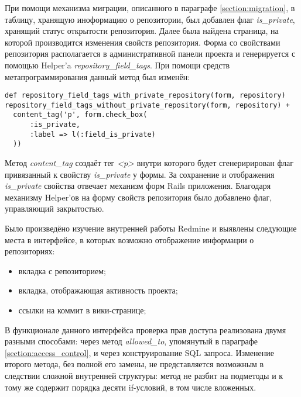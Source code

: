 При помощи механизма миграции, описанного в параграфе \ref{section:migration},
в таблицу, хранящую иноформацию о репозитории, был добавлен флаг \textit{is\_private},
хранящий статус открытости репозитория. Далее была найдена страница, на которой
производится изменения свойств репозитория. Форма со свойствами репозитория
располагается в административной панели проекта и генерируется с помощью
Helper'a \textit{repository\_field\_tags}. При помощи средств метапрограммирования
данный метод был изменён:
\small{\begin{lstlisting}
def repository_field_tags_with_private_repository(form, repository)
repository_field_tags_without_private_repository(form, repository) +
  content_tag('p', form.check_box(
      :is_private,
      :label => l(:field_is_private)
  ))
\end{lstlisting}}
Метод \textit{content\_tag} создаёт тег \textit{<p>} внутри которого будет
сгенеририрован флаг привязанный к свойству \textit{is\_private} у формы. За
сохранение и отображения \textit{is\_private} свойства отвечает механизм форм
Rails приложения.
Благодаря механизму Helper'ов на форму свойств репозитория было добавлено флаг,
управляющий закрытостью.

Было произведёно изучение внутренней работы Redmine и выявлены следующие места
в интерфейсе, в которых возможно отображение информации о репозиториях:
\begin{itemize}
  \item вкладка с репозиторием;
  \item вкладка, отображающая активность проекта;
  \item ссылки на коммит в вики-странице;
\end{itemize}
В функционале данного интерфейса проверка прав доступа реализована двумя
разными способами: через метод \textit{allowed\_to}, упомянутый в параграфе
\ref{section:access_control}, и через конструирование SQL запроса. Изменение
второго метода, без полной его замены, не представляется возможным в следствии
сложной внутренней структуры: метод не разбит на подметоды и к тому же содержит
порядка десяти if-условий, в том числе вложенных.

